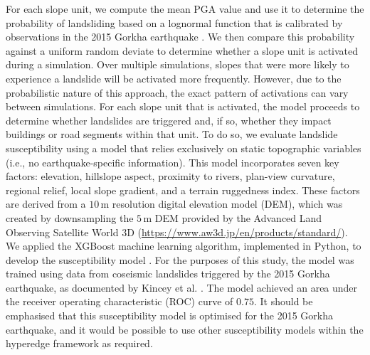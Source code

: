 \documentclass[preprint,12pt,authoryear]{elsarticle}
\begin{document}
For each slope unit, we compute the mean PGA value and use it to determine the probability of landsliding based on a lognormal function that is calibrated by observations in the 2015 Gorkha earthquake \citep{Dunant2025}. We then compare this probability against a uniform random deviate to determine whether a slope unit is activated during a simulation. Over multiple simulations, slopes that were more likely to experience a landslide will be activated more frequently. However, due to the probabilistic nature of this approach, the exact pattern of activations can vary between simulations. For each slope unit that is activated, the model proceeds to determine whether landslides are triggered and, if so, whether they impact buildings or road segments within that unit. To do so, we evaluate landslide susceptibility using a model that relies exclusively on static topographic variables (i.e., no earthquake-specific information). This model incorporates seven key factors: elevation, hillslope aspect, proximity to rivers, plan-view curvature, regional relief, local slope gradient, and a terrain ruggedness index. These factors are derived from a $10\,\text{m}$ resolution digital elevation model (DEM), which was created by downsampling the $5\,\text{m}$ DEM provided by the Advanced Land Observing Satellite World 3D (\url{https://www.aw3d.jp/en/products/standard/}). We applied the XGBoost machine learning algorithm, implemented in Python, to develop the susceptibility model \citep{Dunant2025}. For the purposes of this study, the model was trained using data from coseismic landslides triggered by the 2015 Gorkha earthquake, as documented by Kincey et al. \citep{Kincey2021}. The model achieved an area under the receiver operating characteristic (ROC) curve of $0.75$. It should be emphasised that this susceptibility model is optimised for the 2015 Gorkha earthquake, and it would be possible to use other susceptibility models within the hyperedge framework as required.
\end{document}
